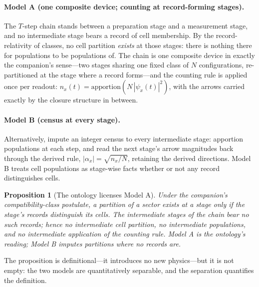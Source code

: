 \documentclass[11pt]{article}
\newtheorem{proposition}{Proposition}
\theoremstyle{definition}
\theoremstyle{remark}
\begin{document}
\paragraph{Model A (one composite device; counting at record-forming stages).} The $T$-step chain stands between a preparation stage and a measurement stage, and no intermediate stage bears a record of cell membership. By the record-relativity of classes, no cell partition \emph{exists} at those stages: there is nothing there for populations to be populations of. The chain is one composite device in exactly the companion's sense---two stages sharing one fixed class of $N$ configurations, re-partitioned at the stage where a record forms---and the counting rule is applied once per readout: $n_x(t) = \mathrm{apportion}\!\left(N\,|\psi_x(t)|^2\right)$, with the arrows carried exactly by the closure structure in between.

\paragraph{Model B (census at every stage).} Alternatively, impute an integer census to every intermediate stage: apportion populations at each step, and read the next stage's arrow magnitudes back through the derived rule, $|\alpha_x| = \sqrt{n_x/N}$, retaining the derived directions. Model B treats cell populations as stage-wise facts whether or not any record distinguishes cells.

\begin{proposition}[The ontology licenses Model A]\label{prop:license}
Under the companion's compatibility-class postulate, a partition of a sector exists at a stage only if the stage's records distinguish its cells. The intermediate stages of the chain bear no such records; hence no intermediate cell partition, no intermediate populations, and no intermediate application of the counting rule. Model A is the ontology's reading; Model B imputes partitions where no records are.
\end{proposition}
The proposition is definitional---it introduces no new physics---but it is not empty: the two models are quantitatively separable, and the separation quantifies the definition.
\end{document}
